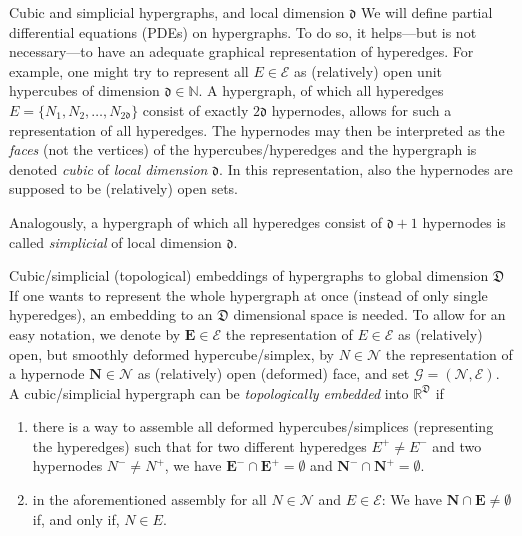 \documentclass[a4paper, english, 12pt, reqno, draft]{amsart}
\makeatletter
\theoremstyle{definition}
\theoremstyle{remark}
\numberwithin{equation}{section}
\newcommand{\setEdge}{\ensuremath{\mathcal E}}
\newcommand{\setNode}{\ensuremath{\mathcal N}}
\newcommand{\edge}{\ensuremath{E}}
\newcommand{\node}{\ensuremath{N}}
\newcommand{\Graph}{\ensuremath{\boldsymbol{\mathcal G}}}
\newcommand{\SetEdge}{\ensuremath{\boldsymbol{\mathcal E}}}
\newcommand{\SetNode}{\ensuremath{\boldsymbol{\mathcal N}}}
\newcommand{\Edge}{{\ensuremath{\boldsymbol E}}}
\newcommand{\Node}{{\ensuremath{\boldsymbol N}}}
\newcommand{\locDim}{\ensuremath{\mathfrak d}}
\newcommand{\globDim}{\ensuremath{\mathfrak D}}
\newcommand{\IN}{\ensuremath{\mathbb N}}
\newcommand{\IR}{\ensuremath{\mathbb R}}
\def\paragraph{\@startsection{paragraph}{4}%
  \z@\z@{-\fontdimen2\font}%
  {\normalfont\scshape}}
\makeatother
\begin{document}
\paragraph{Cubic and simplicial hypergraphs, and local dimension $\locDim$}
% 
We will define partial differential equations (PDEs) on hypergraphs. To do so, it helps---but is not necessary---to have an adequate graphical representation of hyperedges. For example, one might try to represent all $\edge \in \setEdge$ as (relatively) open unit hypercubes of dimension $\locDim \in \IN$. A hypergraph, of which all hyperedges $\edge = \{ \node_1, \node_2, \ldots, \node_{2\locDim} \}$ consist of exactly $2\locDim$ hypernodes, allows for such a representation of all hyperedges. The hypernodes may then be interpreted as the \emph{faces} (not the vertices) of the hypercubes/hyperedges and the hypergraph is denoted \emph{cubic} of \emph{local dimension} $\locDim$. In this representation, also the hypernodes are supposed to be (relatively) open sets.

Analogously, a hypergraph of which all hyperedges consist of $\locDim+1$ hypernodes is called \emph{simplicial} of local dimension $\locDim$.

\paragraph{Cubic/simplicial (topological) embeddings of hypergraphs to global dimension $\globDim$}
% 
If one wants to represent the whole hypergraph at once (instead of only single hyperedges), an embedding to an $\globDim$ dimensional space is needed. To allow for an easy notation, we denote by $\Edge \in \SetEdge$ the representation of $\edge \in \setEdge$ as (relatively) open, but smoothly deformed hypercube/simplex, by $\node \in \setNode$ the representation of a hypernode $\Node \in \SetNode$ as (relatively) open (deformed) face, and set $\Graph = (\SetNode, \SetEdge)$. A cubic/simplicial hypergraph can be \emph{topologically embedded} into $\IR^\globDim$ if
% 
\begin{enumerate}
 \item there is a way to assemble all deformed hypercubes/simplices (representing the hyperedges) such that for two different hyperedges $\edge^+ \neq \edge^-$ and two hypernodes $\node^- \neq \node^+$, we have $\Edge^- \cap \Edge^+ = \emptyset$ and $\Node^- \cap \Node^+ = \emptyset$.
 \item in the aforementioned assembly for all $\node \in \setNode$ and $\edge \in \setEdge$: We have $\Node \cap \Edge \neq \emptyset$ if, and only if, $\node \in \edge$.
\end{enumerate}
% 
\end{document}
